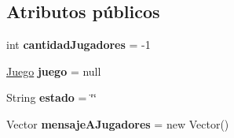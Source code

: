 \subsection*{Atributos públicos}
\begin{DoxyCompactItemize}
\item 
\hypertarget{classBatallaEspacial_1_1Broadcaster_a1ac94a64cff74c32f13e36170f35e6fd}{
int {\bfseries cantidadJugadores} = -\/1}
\label{classBatallaEspacial_1_1Broadcaster_a1ac94a64cff74c32f13e36170f35e6fd}

\item 
\hypertarget{classBatallaEspacial_1_1Broadcaster_ae33d3c37ca42e99dd8fbd56d498eb312}{
\hyperlink{classBatallaEspacial_1_1Juego}{Juego} {\bfseries juego} = null}
\label{classBatallaEspacial_1_1Broadcaster_ae33d3c37ca42e99dd8fbd56d498eb312}

\item 
\hypertarget{classBatallaEspacial_1_1Broadcaster_a3770fba2029f344833e6b21d922748d1}{
String {\bfseries estado} = \char`\"{}\char`\"{}}
\label{classBatallaEspacial_1_1Broadcaster_a3770fba2029f344833e6b21d922748d1}

\item 
\hypertarget{classBatallaEspacial_1_1Broadcaster_ac9d253113ff00d7e3663696a9dbbe5a8}{
Vector {\bfseries mensajeAJugadores} = new Vector()}
\label{classBatallaEspacial_1_1Broadcaster_ac9d253113ff00d7e3663696a9dbbe5a8}

\end{DoxyCompactItemize}
